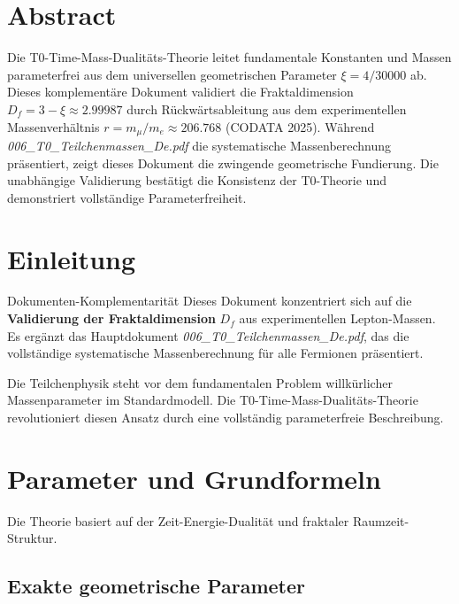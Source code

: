 \section*{Abstract}
		Die T0-Time-Mass-Dualitäts-Theorie leitet fundamentale Konstanten und Massen parameterfrei aus dem universellen geometrischen Parameter $\xi = 4/30000$ ab. Dieses komplementäre Dokument validiert die Fraktaldimension $D_f = 3 - \xi \approx 2.99987$ durch Rückwärtsableitung aus dem experimentellen Massenverhältnis $r = m_{\mu} / m_e \approx 206.768$ (CODATA 2025). Während \emph{006\_T0\_Teilchenmassen\_De.pdf} die systematische Massenberechnung präsentiert, zeigt dieses Dokument die zwingende geometrische Fundierung. Die unabhängige Validierung bestätigt die Konsistenz der T0-Theorie und demonstriert vollständige Parameterfreiheit.

	
	
	\section{Einleitung}
	\label{sec:einfuehrung}
	
	\begin{important}{Dokumenten-Komplementarität}{}
		Dieses Dokument konzentriert sich auf die \textbf{Validierung der Fraktaldimension} $D_f$ aus experimentellen Lepton-Massen. Es ergänzt das Hauptdokument \emph{006\_T0\_Teilchenmassen\_De.pdf}, das die vollständige systematische Massenberechnung für alle Fermionen präsentiert.
	\end{important}
	
	Die Teilchenphysik steht vor dem fundamentalen Problem willkürlicher Massenparameter im Standardmodell. Die T0-Time-Mass-Dualitäts-Theorie revolutioniert diesen Ansatz durch eine vollständig parameterfreie Beschreibung.
	
	\section{Parameter und Grundformeln}
	\label{sec:parameter}
	
	Die Theorie basiert auf der Zeit-Energie-Dualität und fraktaler Raumzeit-Struktur.
	
	\subsection{Exakte geometrische Parameter}
	\label{subsec:exakte_parameter}
	
